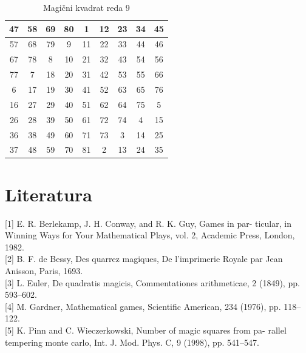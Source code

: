 \documentclass[a4paper,12pt]{article}
\begin{document}
\begin{table}[h]
   \centering
   \caption{Magični kvadrat reda 9}
   \label{table:mag9}
   \begin{tabular}{|c|c|c|c|c|c|c|c|c|}
      \hline
      47 & 58 & 69 & 80 &  1  & 12 & 23 & 34 & 45 \\ \hline
      57 & 68 & 79 &  9  & 11 & 22 & 33 & 44 & 46 \\ \hline
      67 & 78 &  8  & 10 & 21 & 32 & 43 & 54 & 56 \\ \hline
      77 &  7  & 18 & 20 & 31 & 42 & 53 & 55 & 66 \\ \hline
      6  & 17 & 19 & 30 & 41 & 52 & 63 & 65 & 76 \\ \hline
      16 & 27 & 29 & 40 & 51 & 62 & 64 & 75 &  5  \\ \hline
      26 & 28 & 39 & 50 & 61 & 72 & 74 &  4  & 15 \\ \hline
      36 & 38 & 49 & 60 & 71 & 73 &  3  & 14 & 25 \\ \hline
      37 & 48 & 59 & 70 & 81 &  2  & 13 & 24 & 35 \\ \hline
   \end{tabular}
\end{table}

\section*{Literatura}
[1] E. R. Berlekamp, J. H. Conway, and R. K. Guy, Games in par-
ticular, in Winning Ways for Your Mathematical Plays, vol. 2, Academic
Press, London, 1982.
\\[1em]
[2] B. F. de Bessy, Des quarrez magiques, De l’imprimerie Royale par Jean
Anisson, Paris, 1693.
\\[1em]
[3] L. Euler, De quadratis magicis, Commentationes arithmeticae, 2
(1849), pp. 593–602.
\\[1em]
[4] M. Gardner, Mathematical games, Scientific American, 234 (1976),
pp. 118–122.
\\[1em]
[5] K. Pinn and C. Wieczerkowski, Number of magic squares from pa-
rallel tempering monte carlo, Int. J. Mod. Phys. C, 9 (1998), pp. 541–547.
\newpage

\end{document}
